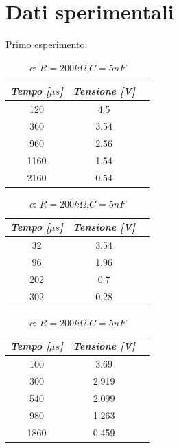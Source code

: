     \section{Dati sperimentali}

    Primo esperimento:
    \begin{table} [!htb]
        \begin{minipage}{.32\linewidth}
            \caption{$a$: $R = 10k\Omega$,$C = 100nF$}
            \centering
            \begin{tabular}{|c|c|c|}
                \hline
                \textit{Tempo [$\mu s$]} & \textit{Tensione [V]} \\
                \hline
                120 & 4.5 \\
                \hline
                360 & 3.54 \\
                \hline
                960 & 2.56 \\
                \hline
                1160 & 1.54 \\
                \hline
                2160 & 0.54 \\
                \hline
            \end{tabular}
        \end{minipage}
        \begin{minipage}{.32\linewidth}
            \caption{$b$: $R = 10k\Omega$,$C = 10nF$}
            \centering
            \begin{tabular}{|c|c|c|}
                \hline
                \textit{Tempo [$\mu s$]} & \textit{Tensione [V]} \\
                \hline
                32 & 3.54 \\
                \hline
                96 & 1.96 \\
                \hline
                202 & 0.7 \\
                \hline
                302 & 0.28 \\
                \hline
            \end{tabular}
        \end{minipage}
        \begin{minipage}{.32\linewidth}
            \caption{$c$: $R = 200k\Omega$,$C = 5nF$}
            \centering
            \begin{tabular}{|c|c|c|}
                \hline
                \textit{Tempo [$\mu s$]} & \textit{Tensione [V]} \\
                \hline
                100 & 3.69 \\
                \hline
                300 & 2.919 \\
                \hline
                540 & 2.099 \\
                \hline
                980 & 1.263 \\
                \hline
                1860 & 0.459 \\
                \hline
            \end{tabular}
        \end{minipage}
        
    \end{table}

